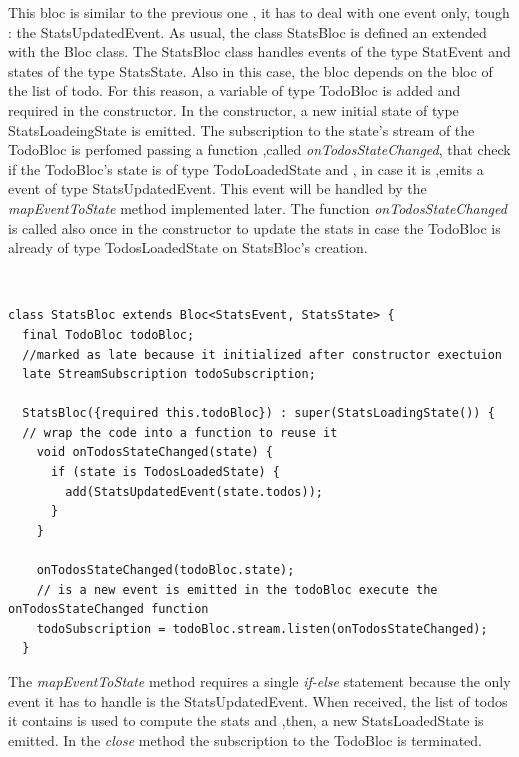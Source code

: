This bloc is similar to the previous one , it has to deal with one event only, tough : the StatsUpdatedEvent. As usual, the class StatsBloc is defined an extended with the Bloc class. The StatsBloc class handles events of the type StatEvent and states of the type StatsState. Also in this case, the bloc depends on the bloc of the list of todo. For this reason, a variable of type TodoBloc is added and required in the constructor. In the constructor, a new initial state of type StatsLoadeingState is emitted. The subscription to the state's stream of the TodoBloc is perfomed passing a function ,called \textit{onTodosStateChanged}, that check if the TodoBloc’s state is of type TodoLoadedState and , in case it is ,emits a event of type StatsUpdatedEvent. This event will be handled by the \textit{mapEventToState} method implemented later. The function \textit{onTodosStateChanged} is called also once in the constructor to update the stats in case the TodoBloc is already of type TodosLoadedState on StatsBloc's creation.
\begin{code}
\mbox{}\\
 \mbox{}
\label{code:2.14}
\begin{verbatim}
class StatsBloc extends Bloc<StatsEvent, StatsState> {
  final TodoBloc todoBloc;
  //marked as late because it initialized after constructor exectuion
  late StreamSubscription todoSubscription;

  StatsBloc({required this.todoBloc}) : super(StatsLoadingState()) {
  // wrap the code into a function to reuse it
    void onTodosStateChanged(state) {
      if (state is TodosLoadedState) {
        add(StatsUpdatedEvent(state.todos));
      }
    }

    onTodosStateChanged(todoBloc.state);
 	// is a new event is emitted in the todoBloc execute the onTodosStateChanged function
    todoSubscription = todoBloc.stream.listen(onTodosStateChanged);
  }
\end{verbatim}
\mbox{}
\end{code}

The \textit{mapEventToState} method requires a single \textit{if-else} statement because the only event it has to handle is the StatsUpdatedEvent. When received, the list of todos it contains is used to compute the stats and ,then, a new StatsLoadedState is emitted. 
In the \textit{close} method the subscription to the TodoBloc is terminated.


